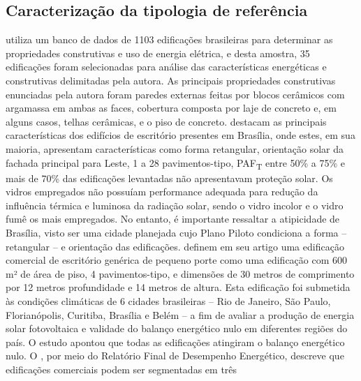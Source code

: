 \subsection{Caracterização da tipologia de referência}
\textcite{Didone2014} utiliza um banco de dados de 1103 edificações brasileiras para 
determinar as propriedades construtivas e uso de energia elétrica, e desta amostra, 35 
edificações foram selecionadas para análise das características energéticas e construtivas 
delimitadas pela autora. As principais propriedades construtivas enunciadas pela autora 
foram paredes externas feitas por blocos cerâmicos com argamassa em ambas as faces, 
cobertura composta por laje de concreto e, em alguns casos, telhas cerâmicas, e o piso de 
concreto.\vspace*{0.3cm}\newline
\textcite{Costa2017} destacam as principais características dos edifícios de 
escritório presentes em Brasília, onde estes, em sua maioria, apresentam características 
como forma retangular, orientação solar da fachada principal para Leste, 1 a 28 
pavimentos-tipo, PAF\textsubscript{T} entre 50\% a 75\% e mais de 70\% das edificações levantadas não 
apresentavam proteção solar. Os vidros empregados não possuíam performance adequada para 
redução da influência térmica e luminosa da radiação solar, sendo o vidro incolor e o 
vidro fumê os mais empregados. No entanto, é importante ressaltar a atipicidade de 
Brasília, visto ser uma cidade planejada cujo Plano Piloto condiciona a forma – 
retangular – e orientação das edificações.\vspace*{0.3cm}\newline
\textcite{Sorgato2018} definem em seu artigo uma edificação comercial de 
escritório genérica de pequeno porte como uma edificação com 600 m² de área de piso, 4 
pavimentos-tipo, e dimensões de 30 metros de comprimento por 12 metros profundidade e 
14 metros de altura. Esta edificação foi submetida às condições climáticas de 6 cidades 
brasileiras – Rio de Janeiro, São Paulo, Florianópolis, Curitiba, Brasília e Belém – a 
fim de avaliar a produção de energia solar fotovoltaica e validade do balanço energético 
nulo em diferentes regiões do país. O estudo apontou que todas as edificações atingiram o 
balanço energético nulo.\vspace*{0.3cm}\newline
O \textcite{ConselhoBrasileirodeConstrucaoSustentavel-CBCS2015}, por meio do Relatório Final de 
Desempenho Energético, descreve que edificações comerciais podem ser segmentadas em três 
